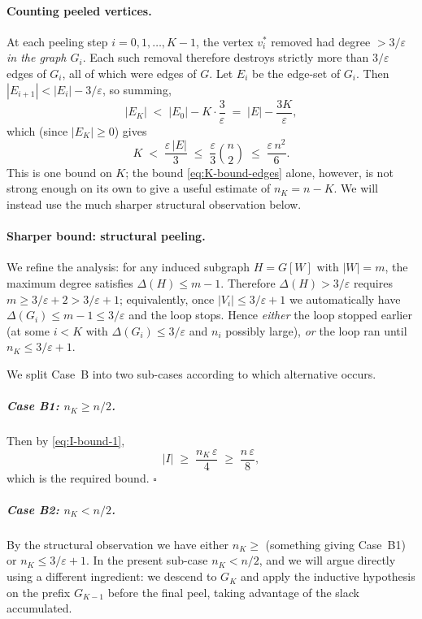 \documentclass[12pt]{article}
\theoremstyle{definition}
\begin{document}
\paragraph{Counting peeled vertices.}
At each peeling step $i=0,1,\ldots,K-1$, the vertex $v_i^*$ removed had degree $>3/\varepsilon$ \emph{in the graph $G_i$}.  Each such removal therefore destroys strictly more than $3/\varepsilon$ edges of $G_i$, all of which were edges of $G$.  Let $E_i$ be the edge-set of $G_i$.  Then $|E_{i+1}| < |E_i| - 3/\varepsilon$, so summing,
\begin{equation}\label{eq:edges}
|E_K| \;<\; |E_0| - K\cdot\frac{3}{\varepsilon} \;=\; |E| - \frac{3K}{\varepsilon},
\end{equation}
which (since $|E_K|\ge 0$) gives
\begin{equation}\label{eq:K-bound-edges}
K \;<\; \frac{\varepsilon\,|E|}{3} \;\le\; \frac{\varepsilon}{3}\binom{n}{2} \;\le\; \frac{\varepsilon\,n^2}{6}.
\end{equation}
This is one bound on $K$; the bound \eqref{eq:K-bound-edges} alone, however, is not strong enough on its own to give a useful estimate of $n_K=n-K$.  We will instead use the much sharper structural observation below.

\paragraph{Sharper bound: structural peeling.}
We refine the analysis: for any induced subgraph $H=G[W]$ with $|W|=m$, the maximum degree satisfies $\Delta(H)\le m-1$.  Therefore $\Delta(H)>3/\varepsilon$ requires $m\ge 3/\varepsilon + 2 > 3/\varepsilon+1$; equivalently, once $|V_i|\le 3/\varepsilon+1$ we automatically have $\Delta(G_i)\le m-1\le 3/\varepsilon$ and the loop stops.  Hence \emph{either} the loop stopped earlier (at some $i<K$ with $\Delta(G_i)\le 3/\varepsilon$ and $n_i$ possibly large), \emph{or} the loop ran until $n_K\le 3/\varepsilon+1$.

We split Case~B into two sub-cases according to which alternative occurs.

\subparagraph{Case B1: $n_K \ge n/2$.}
Then by \eqref{eq:I-bound-1},
\[
|I| \;\ge\; \frac{n_K\,\varepsilon}{4} \;\ge\; \frac{n\,\varepsilon}{8},
\]
which is the required bound.  $\square$

\subparagraph{Case B2: $n_K < n/2$.}
By the structural observation we have either $n_K\ge $ (something giving Case~B1) or $n_K\le 3/\varepsilon+1$.  In the present sub-case $n_K < n/2$, and we will argue directly using a different ingredient: we descend to $G_{K}$ and apply the inductive hypothesis on the prefix $G_{K-1}$ before the final peel, taking advantage of the slack accumulated.
\end{document}
